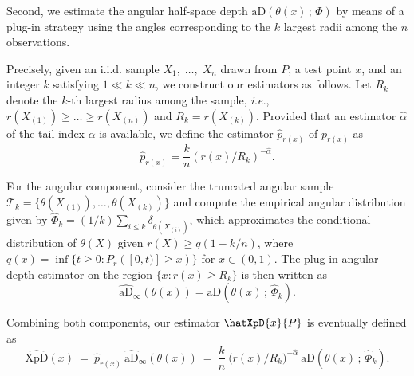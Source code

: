 \documentclass{article}
\numberwithin{equation}{section}
\newcommand{\aD}[2]{{\mathrm{aD}}\left({#1}\,;\,{#2}\right)}
\newcommand{\hataD}[2]{\widehat{\mathrm{aD}}\left({#1}\,;\,{#2}\right)}
\begin{document}
Second, we estimate the angular half-space depth
$\aD{\theta(x)}{\Phi}$ by means of a plug-in strategy using the
angles corresponding to the $k$
largest radii among the $n$ observations.

Precisely, given an i.i.d. sample $X_1,\; \ldots,\; X_n$ drawn from
$P$, a test point $x$, and
an integer $k$ satisfying $1 \ll k \ll n$, we construct our
estimators as follows. Let $R_k$ denote the $k$-th largest radius
among the sample, \textit{i.e.}, $r(X_{(1)})\geq \ldots\geq r(X_{(n)})$ and
$R_k=r(X_{(k)})$. Provided that an estimator $\widehat{\alpha}$ of the tail
index $\alpha$ is available, we
define the estimator $\widehat{p}_{r(x)}$ of $p_{r(x)}$ as
\begin{equation}\label{eq:hat_p_r}
    \widehat{p}_{r(x)} = \frac{k}{n} (r(x)/R_k)^{-\widehat \alpha}.
\end{equation}

For the angular component, consider the truncated angular sample
$\mathcal{T}_k =
\{\theta(X_{(1)}), \ldots, \theta(X_{(k)})\}$ and compute the
empirical angular distribution given
by $\widehat \Phi_k= (1/k)\sum_{i\leq k}
\delta_{\theta(X_{(i)})}$, which approximates the conditional
distribution of $\theta(X)$ given $r(X) \ge q({1-k/n})$, where
$q(x)=\inf\{t\geq 0: P_r([0, t)]\geq x)\}$ for $x\in
(0,1)$. The plug-in angular depth estimator on the region $\{x: r(x)\ge R_k\}$ is then written as
\begin{equation}\label{eq:hat_ahd_theta_x}
\widehat{\mathrm{aD}}_\infty(\theta(x)) = \aD{\theta(x)}{\widehat \Phi_k}.
\end{equation}

Combining both components, our estimator $\hatXpD{x}{P}$ is
eventually defined as
\begin{equation}\label{eq:estimator_coD_extreme_x}
\widehat{\mathrm{XpD}}(x) ~= ~
\widehat{p}_{r(x)} ~\widehat{\mathrm{aD}}_\infty(\theta(x))
~=~\frac{k}{n}~\Big(r(x)/R_k\Big)^{-\widehat \alpha}
~{\aD{\theta(x)}{\widehat \Phi_k}}.
\end{equation}

\end{document}

